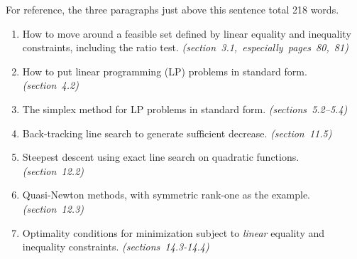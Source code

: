 \documentclass[12pt]{amsart}
\newcommand*\circled[1]{\tikz[baseline=(char.base)]{
            \node[shape=circle,draw,inner sep=2pt] (char) {#1};}}
\begin{document}
\smallskip
For reference, the three paragraphs just above this sentence total 218 words.

\vspace{0.2in}

\newcommand{\ecomment}[1]{ \hfill \mbox{\emph{(#1)}} }

\smallskip
\renewcommand{\labelenumi}{\circled{\arabic{enumi}}}
\begin{enumerate}
\setlength{\itemsep}{4pt}
\item How to move around a feasible set defined by linear equality and inequality constraints, including the ratio test. \hfill \mbox{\emph{(section 3.1, especially pages 80, 81)}}
\item How to put linear programming (LP) problems in standard form.  \ecomment{section 4.2}
\item The simplex method for LP problems in standard form.  \ecomment{sections 5.2--5.4}
\item Back-tracking line search to generate sufficient decrease. \ecomment{section 11.5}
\item Steepest descent using exact line search on quadratic functions.  \ecomment{section 12.2}
\item Quasi-Newton methods, with symmetric rank-one as the example. \ecomment{section 12.3}
\item Optimality conditions for minimization subject to \emph{linear} equality and inequality constraints.  \ecomment{sections 14.3-14.4}
\end{enumerate}
\end{document}
